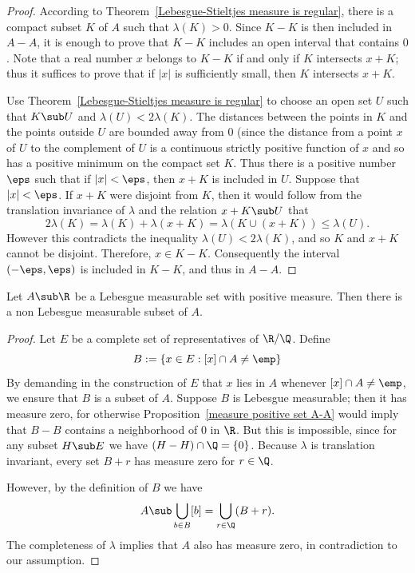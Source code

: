 \begin{proof}
According to Theorem~\ref{Lebesgue-Stieltjes measure is regular}, there is a compact subset $K$ of $A$ such that $\lambda(K)>0$. Since $K-K$ is then included in $A-A$, it is enough to prove that $K-K$ includes an open interval that contains $0$. Note that a real number $x$ belongs to $K-K$ if and only if $K$ intersects $x+K$; thus it suffices to prove that if $|x|$ is sufficiently small, then $K$ intersects $x+K$.\par
Use Theorem~\ref{Lebesgue-Stieltjes measure is regular} to choose an open set $U$ such that $K\sub U$ and $\lambda(U)<2\lambda(K)$. The distances between the points in $K$ and the points outside $U$ are bounded away from $0$ (since the distance from a point $x$ of $U$ to the complement of $U$ is a continuous strictly positive function of $x$ and so has a positive minimum on the compact set $K$. Thus there is a positive number $\eps$ such that if $|x|<\eps$, then $x+K$ is included in $U$. Suppose that $|x|<\eps$. If $x+K$ were disjoint from $K$, then it would follow from the translation invariance of $\lambda$ and the relation $x+K\sub U$ that
\[2\lambda(K)=\lambda(K)+\lambda(x+K)=\lambda(K\cup(x+K))\leq\lambda(U).\]
However this contradicts the inequality $\lambda(U)<2\lambda(K)$, and so $K$ and $x+K$ cannot be disjoint. Therefore, $x\in K-K$. Consequently the interval $(-\eps,\eps)$ is included in $K-K$, and thus in $A-A$.
\end{proof}
\begin{proposition}
Let $A\sub\R$ be a Lebesgue measurable set with positive measure. Then there is a non Lebesgue measurable subset of $A$. 
\end{proposition}
\begin{proof}
Let $E$ be a complete set of representatives of $\R/\Q$. Define 
\[B:=\{x\in E:[x]\cap A\neq\emp\}\]
By demanding in the construction of $E$ that $x$ lies in $A$ whenever $[x]\cap A\neq\emp$, we ensure that $B$ is a subset of $A$. Suppose $B$ is Lebesgue measurable; then it has measure zero, for otherwise Proposition~\ref{measure positive set A-A} would imply that $B-B$ contains a neighborhood of $0$ in $\R$. But this is impossible, since for any subset $H\sub E$ we have $(H-H)\cap\Q=\{0\}$. Because $\lambda$ is translation invariant, every set $B+r$ has measure zero for $r\in\Q$.\par
However, by the definition of $B$ we have
\[A\sub\bigcup_{b\in B}[b]=\bigcup_{r\in\Q}(B+r).\]
The completeness of $\lambda$ implies that $A$ also has measure zero, in contradiction to our assumption.
\end{proof}
